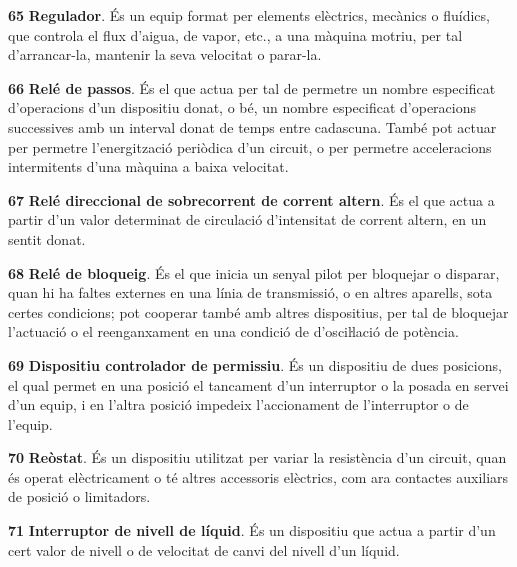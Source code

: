 \begin{multicols}{2}
\begin{list}{}
\item[\textbf{65}]   
\textbf{Regulador}. És un equip format per elements
elèctrics, mecànics o fluídics,  que controla el flux d'aigua, de
vapor, etc.,  a una màquina motriu, per tal d'arrancar-la, mantenir
la seva velocitat o parar-la.

\item[\textbf{66}]   
\textbf{Relé de passos}. És el que actua per tal
de permetre un nombre especificat d'operacions d'un dispositiu
donat, o bé, un nombre especificat d'operacions successives amb un
interval donat de temps entre cadascuna. També pot actuar per
permetre l'energització periòdica d'un circuit, o per permetre acceleracions intermitents d'una
màquina a baixa velocitat.

\item[\textbf{67}]  
\textbf{Relé direccional de sobrecorrent de corrent altern}. És
el que actua a partir d'un valor determinat de circulació
d'intensitat de corrent altern, en un sentit donat.

\item[\textbf{68}]   
\textbf{Relé de bloqueig}. És el que inicia un
senyal pilot per bloquejar o disparar, quan hi ha faltes externes en
una línia de transmissió, o en altres aparells, sota certes
condicions; pot cooperar també amb altres dispositius, per tal de
bloquejar l'actuació o el reenganxament en una condició
de d'osciŀlació de potència.

\item[\textbf{69}]   
\textbf{Dispositiu controlador de permissiu}. És
un dispositiu  de dues posicions, el qual permet en una posició el tancament d'un
interruptor o la posada en servei d'un equip, i en l'altra posició
impedeix l'accionament de l'interruptor o de l'equip.

\item[\textbf{70}]   
\textbf{Reòstat}. És un dispositiu utilitzat per
variar la resistència d'un circuit, quan és operat elèctricament o té altres accessoris elèctrics, com ara contactes auxiliars de posició o limitadors.

\item[\textbf{71}]   
\textbf{Interruptor de nivell de líquid}. És un dispositiu que actua a partir d'un cert valor de nivell o de velocitat de canvi del nivell d'un líquid.


\end{list}
\end{multicols}
